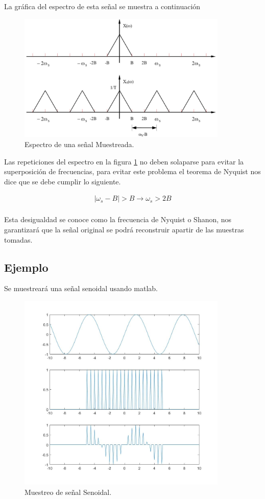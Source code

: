 \documentclass[12pt]{article}
\begin{document}
La gráfica del espectro de esta señal se muestra a continuación
\begin{figure}[h]
    \centering
        \includegraphics[width=10cm]{IMAGENES/1}
        \caption{Espectro de una señal Muestreada.}
        \label{fig:espectro}
\end{figure}

Las repeticiones del espectro en la figura \ref{fig:espectro} no deben solaparse para evitar la superposición de frecuencias, para evitar este problema el teorema de Nyquist nos dice que se debe cumplir lo siguiente.

\begin{equation}
    \begin{split}
        |\omega_s-B|>B\to \omega_s>2B\\
    \end{split}
    \label{eq:espectro_muestreada}
\end{equation}

Esta desigualdad se conoce como la frecuencia de Nyquist o Shanon, nos garantizará que la señal original se podrá reconstruir apartir de las muestras tomadas.
\subsection{Ejemplo}
Se muestreará una señal senoidal usando matlab.


\begin{figure}[h]
    \centering
        \includegraphics[width=10cm]{IMAGENES/2}
        \caption{Muestreo de señal Senoidal.}
\end{figure}
\end{document}
